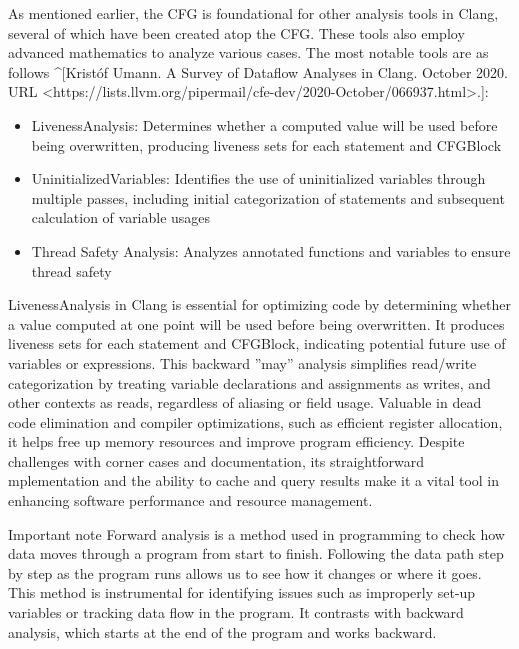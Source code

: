 \begin{markdown}
As mentioned earlier, the CFG is foundational for other analysis tools in Clang, several of which have been created atop the CFG. These tools also employ advanced mathematics to analyze various cases. The most notable tools are as follows ^[Kristóf Umann. A Survey of Dataflow Analyses in Clang. October 2020. URL <https://lists.llvm.org/pipermail/cfe-dev/2020-October/066937.html>.]:
\end{markdown}

\begin{itemize}
\item
LivenessAnalysis: Determines whether a computed value will be used before being overwritten, producing liveness sets for each statement and CFGBlock

\item
UninitializedVariables: Identifies the use of uninitialized variables through multiple passes, including initial categorization of statements and subsequent calculation of variable usages

\item
Thread Safety Analysis: Analyzes annotated functions and variables to ensure thread safety
\end{itemize}

LivenessAnalysis in Clang is essential for optimizing code by determining whether a value computed at one point will be used before being overwritten. It produces liveness sets for each statement and CFGBlock, indicating potential future use of variables or expressions. This backward ”may” analysis simplifies read/write categorization by treating variable declarations and assignments as writes, and other contexts as reads, regardless of aliasing or field usage. Valuable in dead code elimination and compiler optimizations, such as efficient register allocation, it helps free up memory resources and improve program efficiency. Despite challenges with corner cases and documentation, its straightforward mplementation and the ability to cache and query results make it a vital tool in enhancing software performance and resource management.

\begin{myNotic}{Important note}
Forward analysis is a method used in programming to check how data moves through a program from start to finish. Following the data path step by step as the program runs allows us to see how it changes or where it goes. This method is instrumental for identifying issues such as improperly set-up variables or tracking data flow in the program. It contrasts with backward analysis, which starts at the end of the program and works backward.
\end{myNotic}


